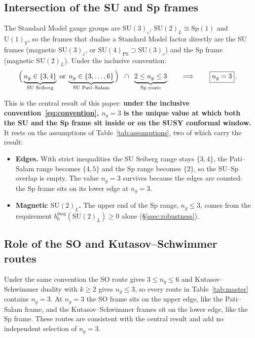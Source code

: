 \documentclass[11pt,a4paper]{article}
\theoremstyle{plain}
\theoremstyle{definition}
\theoremstyle{remark}
\newcommand{\ngen}{n_g}
\newcommand{\SU}[1]{\mathrm{SU}(#1)}
\newcommand{\UU}[1]{\mathrm{U}(#1)}
\newcommand{\Sp}[1]{\mathrm{Sp}(#1)}
\begin{document}
\subsection{Intersection of the SU and Sp frames}
\label{ssec:intersection}

The Standard Model gauge groups are $\SU{3}_c$, $\SU{2}_L \cong \Sp{1}$
and $\UU{1}_Y$, so the frames that dualise a Standard Model factor
directly are the SU frames (magnetic $\SU{3}_c$, or
$\SU{4}_{\mathrm{PS}} \supset \SU{3}_c$) and the Sp frame (magnetic
$\SU{2}_L$).  Under the inclusive convention:
\begin{equation}\label{eq:intersection}
  \Bigl(\,\underbrace{\ngen \in \{3, 4\}}_{\text{SU Seiberg}}
  \;\text{or}\;
  \underbrace{\ngen \in \{3, \ldots, 6\}}_{\text{SU Pati--Salam}}\,\Bigr)
  \;\;\cap\;\;
  \underbrace{2 \leq \ngen \leq 3}_{\text{Sp route}}
  \qquad\Longrightarrow\qquad
  \boxed{\ngen = 3}\,.
\end{equation}

This is the central result of this paper: \textbf{under the inclusive
convention~\eqref{eq:convention}, $\ngen = 3$ is the unique value at which
both the SU and the Sp frame sit inside or on the SUSY conformal window.}
It rests on the assumptions of Table~\ref{tab:assumptions}, two of which
carry the result:
\begin{itemize}
  \item \textbf{Edges.}  With strict inequalities the SU Seiberg range
    stays $\{3, 4\}$, the Pati--Salam range becomes $\{4, 5\}$ and the
    Sp range becomes $\{2\}$, so the SU--Sp overlap is empty.  The value
    $\ngen = 3$ survives because the edges are counted: the Sp frame sits
    on its lower edge at $\ngen = 3$.
  \item \textbf{Magnetic $\SU{2}_L$.}  The upper end of the Sp range,
    $\ngen \leq 3$, comes from the requirement
    $b_0^{\mathrm{mag}}(\SU{2}_L) \geq 0$ alone
    (\S\ref{ssec:robustness}).
\end{itemize}

\subsection{Role of the SO and Kutasov--Schwimmer routes}
\label{ssec:SO-KS-role}

Under the same convention the SO route gives $3 \leq \ngen \leq 6$ and
Kutasov--Schwimmer duality with $k \geq 2$ gives $\ngen \leq 3$, so every
route in Table~\ref{tab:master} contains $\ngen = 3$.  At $\ngen = 3$ the
SO frame sits on the upper edge, like the Pati--Salam frame, and the
Kutasov--Schwimmer frames sit on the lower edge, like the Sp frame.
These routes are consistent with the central result and add no
independent selection of $\ngen = 3$.
\end{document}
